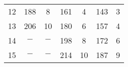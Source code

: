 \documentclass[authoryear]{tex/labreport}
\begin{document}
\begin{table}[htb]
\begin{tabular}{rcccccc}
    12                               & 188                                                                                         & 8                                                                                                                                                                                                 & 161                                                                                                      & 4                                                                                          & 143   & 3                                                                                                \\
    13                               & 206                                                                                         & 10                                                                                                                                                                                                & 180                                                                                                      & 6                                                                                          & 157   & 4                                                                                                  \\
    14                               & $-$                                                                                         & $-$                                                                                                                                                                                               & 198                                                                                                      & 8                                                                                          & 172   & 6                                                                                                  \\
    15                               & $-$                                                                                         & $-$                                                                                                                                                                                               & 214                                                                                                      & 10                                                                                         & 187   & 9                                                                                                  \\

\end{tabular}
\end{table}
\end{document}
